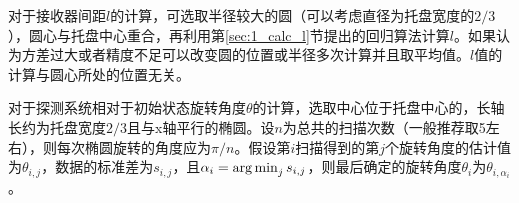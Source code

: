 对于接收器间距$l$的计算，可选取半径较大的圆（可以考虑直径为托盘宽度的$2/3$），圆心与托盘中心重合，再利用第\ref{sec:1_calc_l}节提出的回归算法计算$l$。如果认为方差过大或者精度不足可以改变圆的位置或半径多次计算并且取平均值。$l$值的计算与圆心所处的位置无关。

对于探测系统相对于初始状态旋转角度$\theta$的计算，选取中心位于托盘中心的，长轴长约为托盘宽度$2/3$且与x轴平行的椭圆。设$n$为总共的扫描次数（一般推荐取5左右），则每次椭圆旋转的角度应为$\pi/n$。假设第$i$扫描得到的第$j$个旋转角度的估计值为$\theta_{i,j}$，数据的标准差为$s_{i,j}$，且$\alpha_i = \operatorname*{arg\,min}_j s_{i,j}$，则最后确定的旋转角度$\theta_i$为$\theta_{i, \alpha_i}$。 